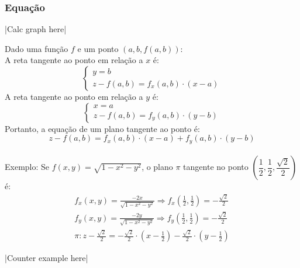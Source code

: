 \documentclass{article}
\begin{document}
\subsubsection{Equação}
\centerline{|Calc graph here|}
Dado uma função $f$ e um ponto $(a, b, f(a,b))$:\\
A reta tangente ao ponto em relação a $x$ é:
\[ \begin{cases}
  y = b\\
  z - f(a,b) = f_x(a, b) \cdot (x - a)
\end{cases} \]
A reta tangente ao ponto em relação a $y$ é:
\[ \begin{cases}
  x = a\\
  z - f(a,b) = f_y(a, b) \cdot (y - b)
\end{cases} \]
Portanto, a equação de um plano tangente ao ponto é:
\[ z - f(a,b) = f_x(a, b) \cdot(x - a) + f_y(a, b) \cdot(y - b) \] \\[10pt]
Exemplo: Se $f(x, y) = \sqrt{1 - x^2 - y^2}$, o plano $\pi$ tangente no ponto $\left(\dfrac{1}{2}, \dfrac{1}{2}, \dfrac{\sqrt{2}}{2}\right)$ é:
\begin{gather*}
  f_x(x, y) = \frac{-2x}{\sqrt{1 - x^2 - y^2}} \Rightarrow f_x\left( \frac{1}{2}, \frac{1}{2} \right) = - \frac{\sqrt{2}}{2} \\
  f_y(x, y) = \frac{-2y}{\sqrt{1 - x^2 - y^2}} \Rightarrow f_y\left( \frac{1}{2}, \frac{1}{2} \right) = - \frac{\sqrt{2}}{2} \\[10pt]
  \pi : z - \frac{\sqrt{2}}{2} = - \frac{\sqrt{2}}{2} \cdot \left( x - \frac{1}{2} \right) - \frac{\sqrt{2}}{2} \cdot \left( y - \frac{1}{2} \right)
\end{gather*}
\centerline{|Counter example here|}
\end{document}
